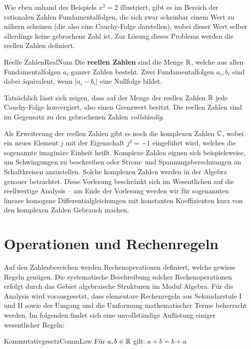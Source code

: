 Wie eben anhand des Beispiels $x^2=2$ illustriert, gibt es im Bereich der rationalen Zahlen Fundamentalfolgen, die sich zwar scheinbar einem Wert zu nähern scheinen (die also eine Cauchy-Folge darstellen),
wobei dieser Wert selber allerdings keine gebrochene Zahl ist. Zur Lösung dieses Problems werden die reellen Zahlen definiert.

\begin{definition}{Reelle Zahlen}{RealNum}
	Die \textbf{reellen Zahlen} sind die Menge $\mathbb{R}$, welche aus allen Fundamentalfolgen $a_i$ ganzer Zahlen besteht. Zwei Fundamentalfolgen $a_i, b_i$ sind dabei äquivalent, wenn $|a_i-b_i|$ eine Nullfolge bildet.
\end{definition}

Tatsächlich lässt sich zeigen, dass auf der Menge der reellen Zahlen $\mathbb{R}$ jede Cauchy-Folge konvergiert, also einen Grenzwert besitzt. Die reellen Zahlen sind im Gegensatz zu den gebrochenen Zahlen \emph{vollständig}.

Als Erweiterung der reellen Zahlen gibt es noch die komplexen Zahlen $\mathbb{C}$, wobei ein neues Element $j$ mit der Eigenschaft $j^2=-1$ eingeführt wird, welches die sogenannte imaginäre Einheit heißt. Komplexe
Zahlen eignen sich beispielsweise, um Schwingungen zu beschreiben oder Strom- und Spannungsberechnungen an Schaltkreisen anzustellen. Solche komplexen Zahlen werden in der Algebra genauer betrachtet. Diese Vorlesung beschränkt sich im Wesentlichen auf die reellwertige Analysis -- am Ende der Vorlesung werden wir für sogenannten lineare homogene Differentialgleichungen mit konstanten Koeffizienten kurz von den komplexen Zahlen Gebrauch machen.

\section{Operationen und Rechenregeln}

Auf den Zahlenbereichen werden Rechenoperationen definiert, welche gewisse Regeln genügen. Die systematische Beschreibung solcher Rechenoperationen erfolgt durch das Gebiet algebraische Strukturen im Modul Algebra. Für die Analysis wird vorausgesetzt, dass elementare Rechenregeln aus Sekundarstufe I und II sowie der Umgang und die Umformung mathematischer Terme beherrscht werden. Im folgenden findet sich eine unvollständige Auflistung einiger wesentlicher Regeln:

\begin{statement}{Kommutativgesetz}{CommLaw}
	Für $a,b\in\mathbb{R}$ gilt: $a + b = b + a$
\end{statement}


